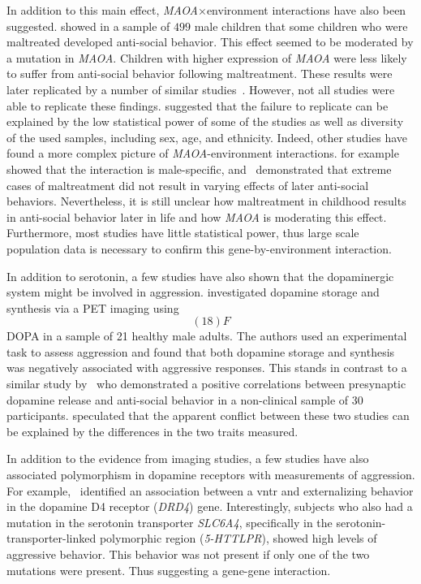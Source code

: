 In addition to this main effect, \textit{MAOA}$\times$environment interactions have also been suggested.
\citet{Caspi2002} showed in a sample of $499$ male children that some children who were maltreated developed anti-social behavior.
This effect seemed to be moderated by a mutation in \textit{MAOA}.
Children with higher expression of \textit{MAOA} were less likely to suffer from anti-social behavior following maltreatment.
These results were later replicated by a number of similar studies~\cite{KimCohen2006}.
However, not all studies were able to replicate these findings.
\citet{Anholt2012} suggested that the failure to replicate can be explained by the low statistical power of some of the studies as well as diversity of the used samples, including sex, age, and ethnicity.
Indeed, other studies have found a more complex picture of \textit{MAOA}-environment interactions.
\citet{Huang2004} for example showed that the interaction is male-specific, and~\citet{Weder2009} demonstrated that extreme cases of maltreatment did not result in varying effects of later anti-social behaviors.
Nevertheless, it is still unclear how maltreatment in childhood results in anti-social behavior later in life and how \textit{MAOA} is moderating this effect.
Furthermore, most studies have little statistical power,
thus large scale population data is necessary to confirm this gene-by-environment interaction.

In addition to serotonin, a few studies have also shown that the dopaminergic system might be involved in aggression.
\citet{Schluter2013} investigated dopamine storage and synthesis via a PET imaging using \[(18)F\]DOPA in a sample of 21 healthy male adults.
The authors used an experimental task to assess aggression and found that both dopamine storage and synthesis was negatively associated with aggressive responses.
This stands in contrast to a similar study by~\citet{Buckholtz2010} who demonstrated a positive correlations between presynaptic dopamine release and anti-social behavior in a non-clinical sample of 30 participants. 
\citet{Rosell2015} speculated that the apparent conflict between these two studies can be explained by the differences in the two traits measured.

In addition to the evidence from imaging studies, a few studies have also associated polymorphism in dopamine receptors with measurements of aggression.
For example,~\citet{Hohmann2009} identified an association between a \acrfull{vntr} and externalizing behavior in the dopamine D4 receptor (\textit{DRD4}) gene.
Interestingly, subjects who also had a mutation in the serotonin transporter \textit{SLC6A4}, specifically in the serotonin-transporter-linked polymorphic region (\textit{5-HTTLPR}), showed high levels of aggressive behavior.
This behavior was not present if only one of the two mutations were present.
Thus suggesting a gene-gene interaction.

